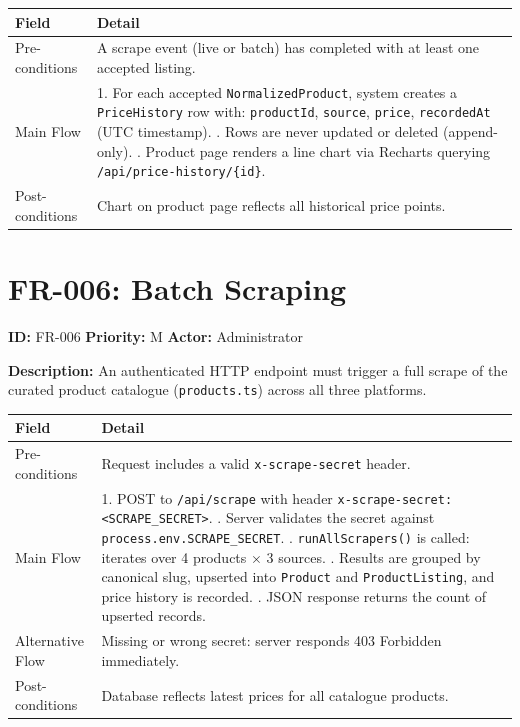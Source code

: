 \documentclass[12pt,a4paper]{report}
\begin{document}
\begin{longtable}{L{3cm} L{10cm}}
  \toprule
  \textbf{Field} & \textbf{Detail} \\
  \midrule
  \endhead
  Pre-conditions & A scrape event (live or batch) has completed with at least
                   one accepted listing. \\[3pt]
  Main Flow &
    1. For each accepted \texttt{NormalizedProduct}, system creates a
       \texttt{PriceHistory} row with: \texttt{productId}, \texttt{source},
       \texttt{price}, \texttt{recordedAt} (UTC timestamp). . Rows are never updated or deleted (append-only). . Product page renders a line chart via Recharts querying
       \texttt{/api/price-history/\{id\}}. \\[3pt]
  Post-conditions & Chart on product page reflects all historical price points. \\
  \bottomrule
\end{longtable}

\section{FR-006: Batch Scraping}

\begin{reqbox}
\textbf{ID:} FR-006 \quad \textbf{Priority:} M \quad \textbf{Actor:} Administrator
\end{reqbox}

\textbf{Description:} An authenticated HTTP endpoint must trigger a full scrape
of the curated product catalogue (\texttt{products.ts}) across all three
platforms.

\begin{longtable}{L{3cm} L{10cm}}
  \toprule
  \textbf{Field} & \textbf{Detail} \\
  \midrule
  \endhead
  Pre-conditions & Request includes a valid \texttt{x-scrape-secret} header. \\[3pt]
  Main Flow &
    1. POST to \texttt{/api/scrape} with header
       \texttt{x-scrape-secret: <SCRAPE\_SECRET>}. . Server validates the secret against \texttt{process.env.SCRAPE\_SECRET}. . \texttt{runAllScrapers()} is called: iterates over 4 products $\times$ 3
       sources. . Results are grouped by canonical slug, upserted into \texttt{Product}
       and \texttt{ProductListing}, and price history is recorded. . JSON response returns the count of upserted records. \\[3pt]
  Alternative Flow &
    Missing or wrong secret: server responds 403 Forbidden immediately. \\[3pt]
  Post-conditions & Database reflects latest prices for all catalogue products. \\
  \bottomrule
\end{longtable}
\end{document}
